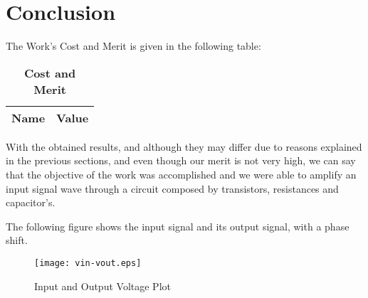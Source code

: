 \section{Conclusion}
\label{sec:conclusion}

The Work's Cost and Merit is given in the following table:

\begin{table}[H]
\centering
\begin{tabular}{|l|l|}
\hline
{\bf Name} & {\bf Value} \\ \hline
    
\end{tabular}
\caption{\textbf{Cost and Merit}}
\end{table}

With the obtained results, and although they may differ due to reasons explained in the previous sections, and even though our merit is not very high, we can say that the objective of the work was accomplished and we were able to amplify an input signal wave through a circuit composed by transistors, resistances and capacitor's.

The following figure shows the input signal and its output signal, with a phase shift.

\begin{figure}[h] 
\centering
\texttt{[image: vin-vout.eps]}
\caption{Input and Output Voltage Plot}
\label{Fig5: In-Out Plot}
\end{figure}
